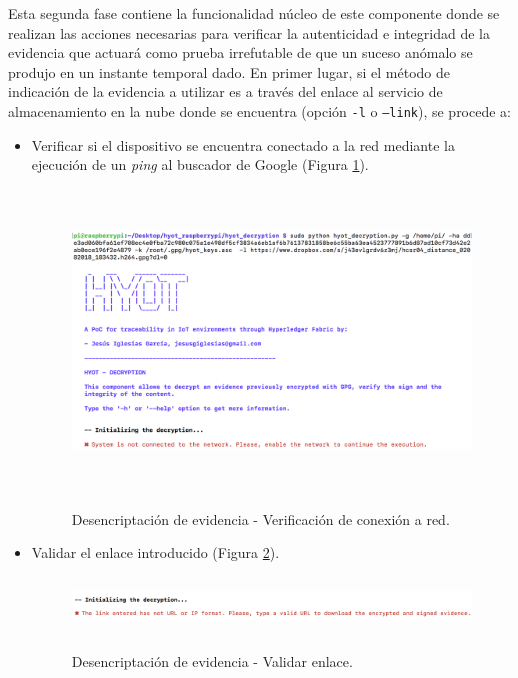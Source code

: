 \documentclass[12pt,a4paper, twoside]{report}
\begin{document}
	Esta segunda fase contiene la funcionalidad núcleo de este componente donde se realizan las acciones necesarias para verificar la autenticidad e integridad de la evidencia que actuará como prueba irrefutable de que un suceso anómalo se produjo en un instante temporal dado. En primer lugar, si el método de indicación de la evidencia a utilizar es a través del enlace al servicio de almacenamiento en la nube donde se encuentra (opción \texttt{-l} o \texttt{--link}), se procede a:
	
	\begin{itemize}
		\item Verificar si el dispositivo se encuentra conectado a la red mediante la ejecución de un \textit{ping} al buscador de Google (Figura \ref{fig:userguide_evidence_ping}).
		
			\begin{figure}[!ht]   
				\caption{Desencriptación de evidencia - Verificación de conexión a red.} 
				\begin{center} 
					\includegraphics[width=14cm,height=8cm]{Images/userGuide/evidence/network} \\
					\label{fig:userguide_evidence_ping} 
				\end{center}  
			\end{figure}
		
		\newpage
		
		\item Validar el enlace introducido (Figura \ref{fig:userguide_evidence_link}).
		
			\begin{figure}[!ht]   
				\caption{Desencriptación de evidencia - Validar enlace.} 
				\begin{center} 
					\includegraphics[width=18cm,height=1.5cm]{Images/userGuide/evidence/invalidLink} \\
					\label{fig:userguide_evidence_link} 
				\end{center}  
			\end{figure}
			

\end{itemize}
\end{document}
